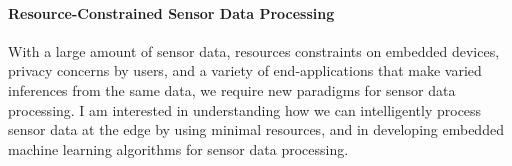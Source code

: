 \documentclass[10pt]{article}
\begin{document}




\paragraph{Resource-Constrained Sensor Data Processing}
With a large amount of sensor data, resources constraints on embedded devices, privacy concerns by users, and a variety of end-applications that make varied inferences from the same data, we require new paradigms for %
sensor data processing. %
I am interested in understanding how we can intelligently process sensor data at the edge by using minimal resources, and in developing embedded machine learning algorithms for sensor data processing. 
\end{document}
